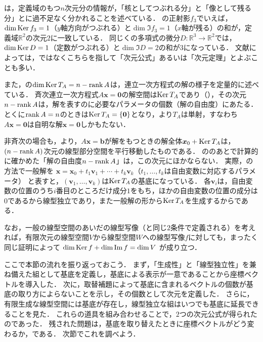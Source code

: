 \begin{remark}[次元公式の解釈と解の自由度]
  は，定義域のもつ$n$次元分の情報が，「核としてつぶれる分」と「像として残る分」とに過不足なく分かれることを述べている．
  の正射影$f_3$でいえば，$\dim \operatorname{Ker} f_3 = 1$（$y$軸方向がつぶれる）と$\dim \Im f_3 = 1$（$x$軸が残る）の和が，定義域$\mathbb{R}^2$の次元$2$に一致している．
  同じくの多項式の微分$D\colon\mathbb{R}^3\to\mathbb{R}^2$では，$\dim\operatorname{Ker} D=1$（定数がつぶれる）と$\dim\Im D=2$の和が$3$になっている．
  文献によっては，ではなくこちらを指して「次元公式」あるいは「次元定理」とよぶことも多い．

  また，の$\dim \operatorname{Ker} T_A = n - \operatorname{rank} A$は，連立一次方程式の解の様子を定量的に述べている．
  斉次連立一次方程式$A\bm{x} = \bm{0}$の解空間は$\operatorname{Ker} T_A$であり（），その次元$n - \operatorname{rank} A$は，解を表すのに必要なパラメータの個数（解の自由度）にあたる．
  とくに$\operatorname{rank} A = n$のときは$\operatorname{Ker} T_A = \{\bm{0}\}$となり，より$T_A$は単射，すなわち$A\bm{x} = \bm{0}$は自明な解$\bm{x} = \bm{0}$しかもたない．

  非斉次の場合も，より，$A\bm{x} = \bm{b}$が解をもつときの解全体$\bm{x}_0 + \operatorname{Ker} T_A$は，$(n - \operatorname{rank} A)$次元の線型部分空間を平行移動したものである．
  ののあとで計算的に確かめた「解の自由度$n - \operatorname{rank} A$」は，この次元にほかならない．
  実際，の方法で一般解を
  $\bm{x} = \bm{x}_0 + t_1 \bm{v}_1 + \cdots + t_k \bm{v}_k$（$t_1, \dots, t_k$は自由変数に対応するパラメータ）
  と表すと，$(\bm{v}_1, \dots, \bm{v}_k)$は$\operatorname{Ker} T_A$の基底になっている．
  各$\bm{v}_i$は，自由変数の位置のうち$i$番目のところだけ成分$1$をもち，ほかの自由変数の位置の成分は$0$であるから線型独立であり，また一般解の形から$\operatorname{Ker} T_A$を生成するからである．

  なお，一般の線型空間のあいだの線型写像（と同じ$2$条件で定義される）を考えれば，有限次元の線型空間$V$から線型空間$W$への線型写像$f$に対しても，まったく同じ証明によって
  $\dim \operatorname{Ker} f + \dim \operatorname{Im} f = \dim V$
  が成り立つ．
\end{remark}

ここで本節の流れを振り返っておこう．
まず，「生成性」と「線型独立性」を兼ね備えた組として基底を定義し，基底による表示が一意であることから座標ベクトルを導入した．
次に，取替補題によって基底に含まれるベクトルの個数が基底の取り方によらないことを示し，その個数として次元を定義した．
さらに，有限生成な線型空間には基底が存在し，線型独立な組はいつでも基底に延長できることを見た．
これらの道具を組み合わせることで，$2$つの次元公式が得られたのであった．
残された問題は，基底を取り替えたときに座標ベクトルがどう変わるか，である．
次節でこれを調べよう．

